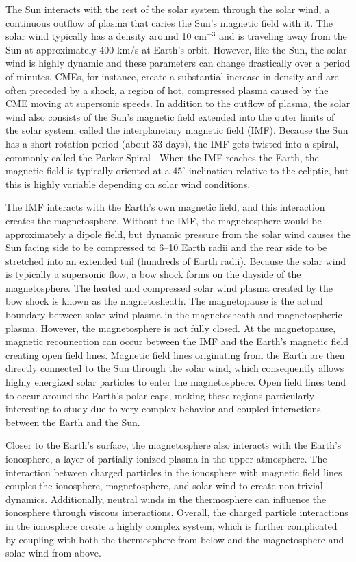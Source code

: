 The Sun interacts with the rest of the solar system through the solar wind, a continuous outflow of plasma that caries the Sun's magnetic field with it.  The solar wind typically has a density around 10 cm\(^{-3}\) and is traveling away from the Sun at approximately 400 km/s at Earth's orbit.  However, like the Sun, the solar wind is highly dynamic and these parameters can change drastically over a period of minutes.  CMEs, for instance, create a substantial increase in density and are often preceded by a shock, a region of hot, compressed plasma caused by the CME moving at supersonic speeds.  In addition to the outflow of plasma, the solar wind also consists of the Sun's magnetic field extended into the outer limits of the solar system, called the interplanetary magnetic field (IMF).  Because the Sun has a short rotation period (about 33 days), the IMF gets twisted into a spiral, commonly called the Parker Spiral \citep{Parker1958}.  When the IMF reaches the Earth, the magnetic field is typically oriented at a \(45^\circ\) inclination relative to the ecliptic, but this is highly variable depending on solar wind conditions.

The IMF interacts with the Earth's own magnetic field, and this interaction creates the magnetosphere.  Without the IMF, the magnetosphere would be approximately a dipole field, but dynamic pressure from the solar wind causes the Sun facing side to be compressed to 6--10 Earth radii and the rear side to be stretched into an extended tail (hundreds of Earth radii).  Because the solar wind is typically a supersonic flow, a bow shock forms on the dayside of the magnetosphere.  The heated and compressed solar wind plasma created by the bow shock is known as the magnetosheath.  The magnetopause is the actual boundary between solar wind plasma in the magnetosheath and magnetospheric plasma.  However, the magnetosphere is not fully closed.  At the magnetopause, magnetic reconnection can occur between the IMF and the Earth's magnetic field creating open field lines.  Magnetic field lines originating from the Earth are then directly connected to the Sun through the solar wind, which consequently allows highly energized solar particles to enter the magnetosphere.  Open field lines tend to occur around the Earth's polar caps, making these regions particularly interesting to study due to very complex behavior and coupled interactions between the Earth and the Sun.

Closer to the Earth's surface, the magnetosphere also interacts with the Earth's ionosphere, a layer of partially ionized plasma in the upper atmosphere.  The interaction between charged particles in the ionosphere with magnetic field lines couples the ionosphere, magnetosphere, and solar wind to create non-trivial dynamics.  Additionally,  neutral winds in the thermosphere can influence the ionosphere through viscous interactions.  Overall, the charged particle interactions in the ionosphere create a highly complex system, which is further complicated by coupling with both the thermosphere from below and the magnetosphere and solar wind from above.  

